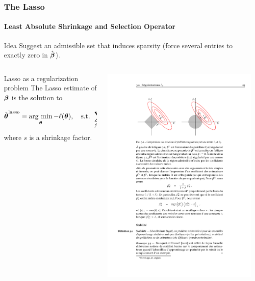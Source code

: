 \begin{frame}
  \frametitle{The Lasso}
  \framesubtitle{Least Absolute Shrinkage and Selection Operator}

  \begin{block}{Idea}
    Suggest  an admissible  set that  induces  \alert{sparsity} (force
    several entries to exactly zero in $\hat{\boldsymbol\beta}$).
  \end{block}

  \vfill

  \begin{overlayarea}{\textwidth}{.4\textheight}
    \begin{columns}
      \begin{column}[c]{.6\textwidth}
        \begin{block}{Lasso as a regularization problem}
          The Lasso estimate of $\boldsymbol\beta$ is the solution to
          \begin{equation*}
            \hat{\boldsymbol\theta}^{\text{lasso}}     =    \mathop{\mathrm{arg\ min}}_{\boldsymbol\theta}
            -\ell(\boldsymbol\theta),  \quad   \text{s.t.  }  \sum_{j=1}^p
            \left|\Omega_j\right|
            \leq s,
          \end{equation*}
          where $s$ is a shrinkage factor.
        \end{block}
      \end{column}
      \begin{column}{.4\textwidth}
        \includegraphics[width=.75\textwidth]{figures/lasso_set}
      \end{column}
    \end{columns}
  \end{overlayarea}

\end{frame}

